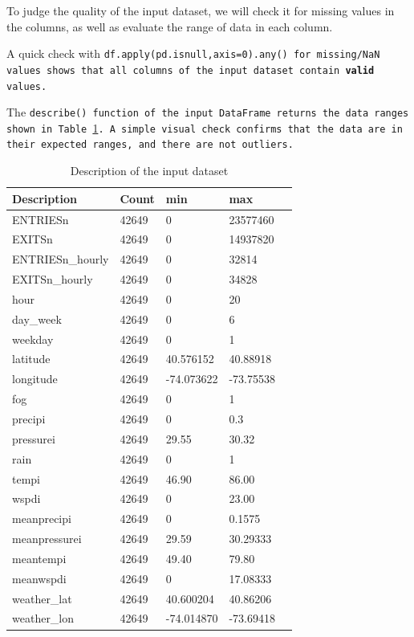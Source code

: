 \documentclass{article}
\begin{document}
To judge the quality of the input dataset, we will check it for missing values in the columns, as well as evaluate the range of data in each column.

A quick check with \tt df.apply(pd.isnull,axis=0).any() \rm for missing/NaN values shows that all columns of the input dataset contain \textbf{valid} values. 

The \tt describe() \rm function of the input DataFrame returns the data ranges shown in Table \ref{tab:input-set-describe}. A simple visual check confirms that the data are in their expected ranges, and there are not outliers.

\begin{table}[]
\centering
\begin{tabular}{l| llll}
\hline
Description      & Count &  min & max           \\
\hline
ENTRIESn         & 42649 &  0   & 23577460  \\
EXITSn           & 42649 &  0   & 14937820  \\
ENTRIESn\_hourly & 42649 &  0   & 32814  \\
EXITSn\_hourly   & 42649 &  0   & 34828  \\
hour             & 42649 &  0   & 20  \\
day\_week        & 42649 &  0   & 6  \\
weekday          & 42649 &  0   & 1  \\
latitude         & 42649 &  40.576152  & 40.88918  \\
longitude        & 42649 &  -74.073622 & -73.75538 \\
fog              & 42649 &  0   & 1  \\
precipi          & 42649 &  0   & 0.3  \\
pressurei        & 42649 &  29.55  & 30.32  \\
rain             & 42649 &  0   & 1  \\
tempi            & 42649 &  46.90  & 86.00  \\
wspdi            & 42649 &  0   & 23.00  \\
meanprecipi      & 42649 &  0   & 0.1575  \\
meanpressurei    & 42649 &  29.59 & 30.29333  \\
meantempi        & 42649 &  49.40  & 79.80  \\
meanwspdi        & 42649 &  0   & 17.08333  \\
weather\_lat     & 42649 &  40.600204  & 40.86206  \\
weather\_lon     & 42649 &  -74.014870 & -73.69418 \\
\hline
\end{tabular}
\caption{Description of the input dataset}
\label{tab:input-set-describe}
\end{table}
\end{document}
